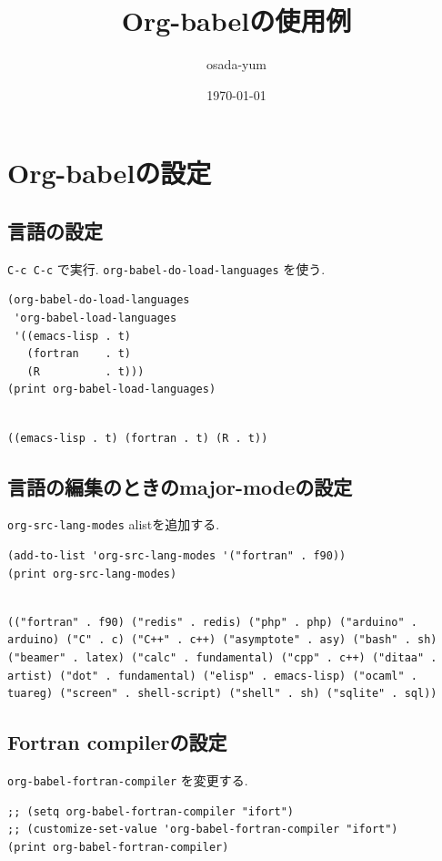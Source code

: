 \documentclass[lualatex,a4paper,12pt,report,ja=standard]{bxjsarticle}
\author{osada-yum}
\date{\today}
\title{Org-babelの使用例}
\begin{document}
\maketitle
\tableofcontents

\hypersetup{pdfauthor=osada-yum}

\section{Org-babelの設定}
\label{sec:orgae3fd0e}
\subsection{言語の設定}
\label{sec:orgfb068ed}
\texttt{C-c C-c} で実行.
\texttt{org-babel-do-load-languages} を使う.
\begin{verbatim}
(org-babel-do-load-languages
 'org-babel-load-languages
 '((emacs-lisp . t)
   (fortran    . t)
   (R          . t)))
(print org-babel-load-languages)
\end{verbatim}

\begin{verbatim}

((emacs-lisp . t) (fortran . t) (R . t))
\end{verbatim}

\subsection{言語の編集のときのmajor-modeの設定}
\label{sec:org869afa3}
\texttt{org-src-lang-modes} alistを追加する.
\begin{verbatim}
(add-to-list 'org-src-lang-modes '("fortran" . f90))
(print org-src-lang-modes)
\end{verbatim}

\begin{verbatim}

(("fortran" . f90) ("redis" . redis) ("php" . php) ("arduino" . arduino) ("C" . c) ("C++" . c++) ("asymptote" . asy) ("bash" . sh) ("beamer" . latex) ("calc" . fundamental) ("cpp" . c++) ("ditaa" . artist) ("dot" . fundamental) ("elisp" . emacs-lisp) ("ocaml" . tuareg) ("screen" . shell-script) ("shell" . sh) ("sqlite" . sql))
\end{verbatim}

\subsection{Fortran compilerの設定}
\label{sec:orgca107ae}
\texttt{org-babel-fortran-compiler} を変更する.
\begin{verbatim}
;; (setq org-babel-fortran-compiler "ifort")
;; (customize-set-value 'org-babel-fortran-compiler "ifort")
(print org-babel-fortran-compiler)
\end{verbatim}
\end{document}
